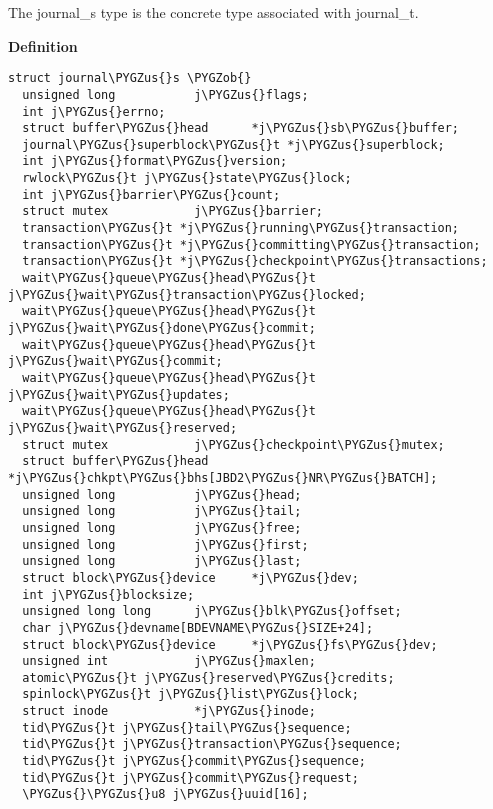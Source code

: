 \documentclass[a4paper,8pt,english]{sphinxmanual}
\def\PYGZus{\char`\_}
\def\PYGZob{\char`\{}
\begin{document}
\begin{fulllineitems}
\label{filesystems/index:c.journal_s}
The journal\_s type is the concrete type associated with journal\_t.

\end{fulllineitems}


\textbf{Definition}

\begin{Verbatim}[commandchars=\\\{\}]
struct journal\PYGZus{}s \PYGZob{}
  unsigned long           j\PYGZus{}flags;
  int j\PYGZus{}errno;
  struct buffer\PYGZus{}head      *j\PYGZus{}sb\PYGZus{}buffer;
  journal\PYGZus{}superblock\PYGZus{}t *j\PYGZus{}superblock;
  int j\PYGZus{}format\PYGZus{}version;
  rwlock\PYGZus{}t j\PYGZus{}state\PYGZus{}lock;
  int j\PYGZus{}barrier\PYGZus{}count;
  struct mutex            j\PYGZus{}barrier;
  transaction\PYGZus{}t *j\PYGZus{}running\PYGZus{}transaction;
  transaction\PYGZus{}t *j\PYGZus{}committing\PYGZus{}transaction;
  transaction\PYGZus{}t *j\PYGZus{}checkpoint\PYGZus{}transactions;
  wait\PYGZus{}queue\PYGZus{}head\PYGZus{}t j\PYGZus{}wait\PYGZus{}transaction\PYGZus{}locked;
  wait\PYGZus{}queue\PYGZus{}head\PYGZus{}t j\PYGZus{}wait\PYGZus{}done\PYGZus{}commit;
  wait\PYGZus{}queue\PYGZus{}head\PYGZus{}t j\PYGZus{}wait\PYGZus{}commit;
  wait\PYGZus{}queue\PYGZus{}head\PYGZus{}t j\PYGZus{}wait\PYGZus{}updates;
  wait\PYGZus{}queue\PYGZus{}head\PYGZus{}t j\PYGZus{}wait\PYGZus{}reserved;
  struct mutex            j\PYGZus{}checkpoint\PYGZus{}mutex;
  struct buffer\PYGZus{}head      *j\PYGZus{}chkpt\PYGZus{}bhs[JBD2\PYGZus{}NR\PYGZus{}BATCH];
  unsigned long           j\PYGZus{}head;
  unsigned long           j\PYGZus{}tail;
  unsigned long           j\PYGZus{}free;
  unsigned long           j\PYGZus{}first;
  unsigned long           j\PYGZus{}last;
  struct block\PYGZus{}device     *j\PYGZus{}dev;
  int j\PYGZus{}blocksize;
  unsigned long long      j\PYGZus{}blk\PYGZus{}offset;
  char j\PYGZus{}devname[BDEVNAME\PYGZus{}SIZE+24];
  struct block\PYGZus{}device     *j\PYGZus{}fs\PYGZus{}dev;
  unsigned int            j\PYGZus{}maxlen;
  atomic\PYGZus{}t j\PYGZus{}reserved\PYGZus{}credits;
  spinlock\PYGZus{}t j\PYGZus{}list\PYGZus{}lock;
  struct inode            *j\PYGZus{}inode;
  tid\PYGZus{}t j\PYGZus{}tail\PYGZus{}sequence;
  tid\PYGZus{}t j\PYGZus{}transaction\PYGZus{}sequence;
  tid\PYGZus{}t j\PYGZus{}commit\PYGZus{}sequence;
  tid\PYGZus{}t j\PYGZus{}commit\PYGZus{}request;
  \PYGZus{}\PYGZus{}u8 j\PYGZus{}uuid[16];

\end{Verbatim}
\end{document}
